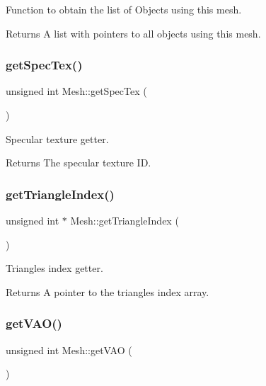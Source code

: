 Function to obtain the list of Objects using this mesh. 

\begin{DoxyReturn}{Returns}
A list with pointers to all objects using this mesh. 
\end{DoxyReturn}
\mbox{\label{class_mesh_ad4787ea15b5ad63eed00a1a0ef272637}} 
\subsubsection{\texorpdfstring{get\+Spec\+Tex()}{getSpecTex()}}
{\footnotesize\ttfamily unsigned int Mesh\+::get\+Spec\+Tex (\begin{DoxyParamCaption}{ }\end{DoxyParamCaption})}



Specular texture getter. 

\begin{DoxyReturn}{Returns}
The specular texture ID. 
\end{DoxyReturn}
\mbox{\label{class_mesh_a99962ed2f4a6a0999127f5e4defef6dc}} 
\subsubsection{\texorpdfstring{get\+Triangle\+Index()}{getTriangleIndex()}}
{\footnotesize\ttfamily unsigned int $\ast$ Mesh\+::get\+Triangle\+Index (\begin{DoxyParamCaption}{ }\end{DoxyParamCaption})}



Triangles index getter. 

\begin{DoxyReturn}{Returns}
A pointer to the triangles index array. 
\end{DoxyReturn}
\mbox{\label{class_mesh_add2e2bafe60711ec9f67308c140640a9}} 
\subsubsection{\texorpdfstring{get\+V\+A\+O()}{getVAO()}}
{\footnotesize\ttfamily unsigned int Mesh\+::get\+V\+AO (\begin{DoxyParamCaption}{ }\end{DoxyParamCaption})}




